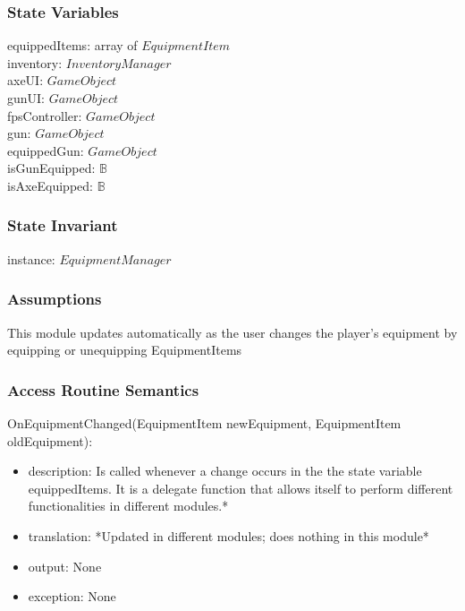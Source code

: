 \documentclass[12pt]{article}
\begin{document}
\subsubsection* {State Variables}

equippedItems: array of $EquipmentItem$\\
inventory: $InventoryManager$ \\
{\color{magenta} axeUI: $GameObject$} \\
{\color{magenta} gunUI: $GameObject$} \\
{\color{magenta} fpsController: $GameObject$} \\
{\color{magenta} gun: $GameObject$} \\
{\color{magenta} equippedGun: $GameObject$} \\
{\color{magenta} isGunEquipped: $\mathbb{B}$} \\
{\color{magenta} isAxeEquipped: $\mathbb{B}$} \\


\subsubsection* {State Invariant}

instance: $EquipmentManager$

\subsubsection* {Assumptions}

This module updates automatically as the user changes the player's equipment by equipping or unequipping EquipmentItems

\subsubsection* {Access Routine Semantics}

\noindent OnEquipmentChanged(EquipmentItem newEquipment, EquipmentItem oldEquipment):
\begin{itemize}
\item description: Is called whenever a change occurs in the the state variable equippedItems. It is a delegate function that allows itself to perform different functionalities in different modules.*
\item translation: *Updated in different modules; does nothing in this module*
\item output: None
\item exception: None
\end{itemize}
\end{document}
